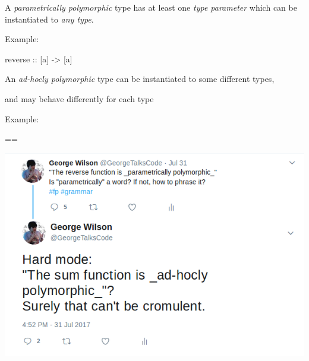\documentclass[usenames,dvipsnames,svgnames,table,aspectratio=169,mathserif]{beamer}
\newcommand{\nl}{\vspace{\baselineskip}}
\newcommand{\pnl}{\pause \nl}
\begin{document}
\begin{frame}[fragile]

A {\it parametrically polymorphic} type has at least one {\it type parameter}
which can be instantiated to {\it any type}.

\nl



Example:

\begin{haskellcode}
reverse :: [a] -> [a]
\end{haskellcode}

\end{frame}


\begin{frame}[fragile]

An {\it ad-hocly polymorphic} type can be instantiated to some different types,

and may behave differently for each type

\nl

Example:

\begin{javacode}
==
\end{javacode}

\end{frame}


\begin{frame}
\begin{center}
\includegraphics[scale=0.5]{cromulent.png}
\end{center}
\end{frame}
\end{document}
